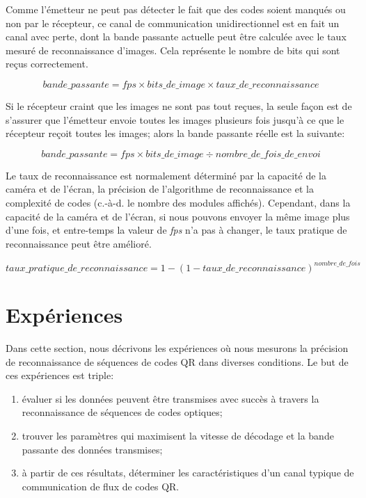 Comme l'émetteur ne peut pas détecter le fait que des codes soient manqués ou non par le récepteur, ce canal de communication unidirectionnel est en fait un canal avec perte, dont la bande passante actuelle peut être calculée avec le taux mesuré de reconnaissance d'images. Cela représente le nombre de bits qui sont reçus correctement.

\begin{equation*}
  bande\_passante = \mathit{fps} \times \mathit{bits\_de\_image} \times \mathit{taux\_de\_reconnaissance}
\end{equation*}

Si le récepteur craint que les images ne sont pas tout reçues, la seule façon est de s'assurer que l'émetteur envoie toutes les images plusieurs fois jusqu'à ce que le récepteur reçoit toutes les images; alors la bande passante réelle est la suivante:

\begin{equation*}
  bande\_passante = \mathit{fps} \times \mathit{bits\_de\_image} \div \mathit{nombre\_de\_fois\_de\_envoi}
\end{equation*}

Le taux de reconnaissance est normalement déterminé par la capacité de la caméra et de l'écran, la précision de l'algorithme de reconnaissance et la complexité de codes (c.-à-d. le nombre des modules affichés). Cependant, dans la capacité de la caméra et de l'écran, si nous pouvons envoyer la même image plus d'une fois, et entre-temps la valeur de \emph{fps} n'a pas à changer, le taux pratique de reconnaissance peut être amélioré.

\begin{equation*}
\mathit{taux\_pratique\_de\_reconnaissance} = 1 - (1 - \mathit{taux\_de\_reconnaissance})^{nombre\_de\_fois}
\end{equation*}



\section{Expériences}\label{sec:qr:experiments} %

Dans cette section, nous décrivons les expériences où nous mesurons la précision de reconnaissance de séquences de codes QR dans diverses conditions. Le but de ces expériences est triple:

\begin{enumerate}
\item évaluer si les données peuvent être transmises avec succès à travers la reconnaissance de séquences de codes optiques;
\item trouver les paramètres qui maximisent la vitesse de décodage et la bande passante des données transmises;
\item à partir de ces résultats, déterminer les caractéristiques d'un canal typique de communication de flux de codes QR.
\end{enumerate}

